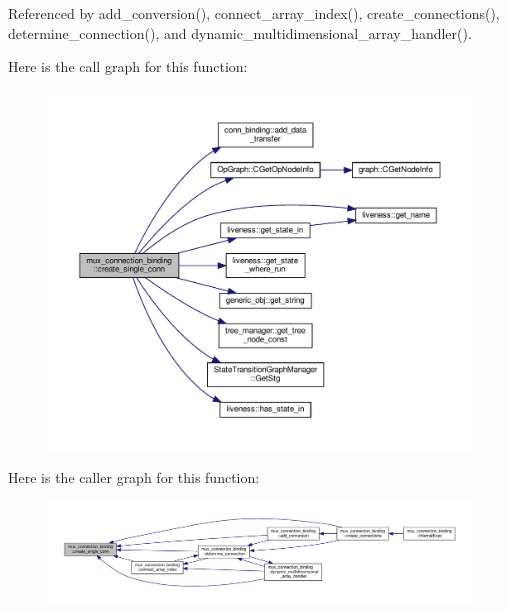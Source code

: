 Referenced by add\+\_\+conversion(), connect\+\_\+array\+\_\+index(), create\+\_\+connections(), determine\+\_\+connection(), and dynamic\+\_\+multidimensional\+\_\+array\+\_\+handler().

Here is the call graph for this function\+:
\nopagebreak
\begin{figure}[H]
\begin{center}
\leavevmode
\includegraphics[width=350pt]{d7/d1e/classmux__connection__binding_ae17b2f5ce5c792eabdf7d5343e866b05_cgraph}
\end{center}
\end{figure}
Here is the caller graph for this function\+:
\nopagebreak
\begin{figure}[H]
\begin{center}
\leavevmode
\includegraphics[width=350pt]{d7/d1e/classmux__connection__binding_ae17b2f5ce5c792eabdf7d5343e866b05_icgraph}
\end{center}
\end{figure}
\mbox{\label{classmux__connection__binding_ad6e5804e02d1a7c926ecdb1ae458a76f}} 
